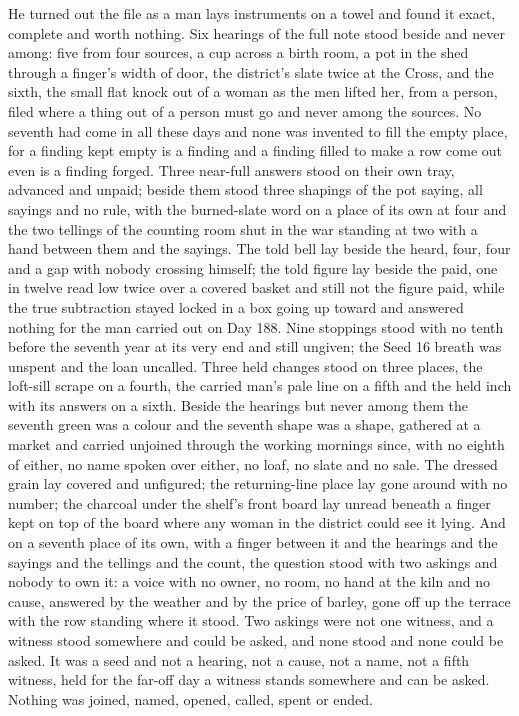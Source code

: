 He turned out the file as a man lays instruments on a towel and found it exact, complete and worth nothing. Six hearings of the full note stood beside and never among: five from four sources, a cup across a birth room, a pot in the shed through a finger's width of door, the district's slate twice at the Cross, and the sixth, the small flat knock out of a woman as the men lifted her, from a person, filed where a thing out of a person must go and never among the sources. No seventh had come in all these days and none was invented to fill the empty place, for a finding kept empty is a finding and a finding filled to make a row come out even is a finding forged. Three near-full answers stood on their own tray, advanced and unpaid; beside them stood three shapings of the pot saying, all sayings and no rule, with the burned-slate word on a place of its own at four and the two tellings of the counting room shut in the war standing at two with a hand between them and the sayings. The told bell lay beside the heard, four, four and a gap with nobody crossing himself; the told figure lay beside the paid, one in twelve read low twice over a covered basket and still not the figure paid, while the true subtraction stayed locked in a box going up toward  and answered nothing for the man carried out on Day 188. Nine stoppings stood with no tenth before the seventh year at its very end and still ungiven; the Seed 16 breath was unspent and the loan uncalled. Three held changes stood on three places, the loft-sill scrape on a fourth, the carried man's pale line on a fifth and the held inch with its answers on a sixth. Beside the hearings but never among them the seventh green was a colour and the seventh shape was a shape, gathered at a market and carried unjoined through the working mornings since, with no eighth of either, no name spoken over either, no loaf, no slate and no sale. The dressed grain lay covered and unfigured; the returning-line place lay gone around with no number; the charcoal under the shelf's front board lay unread beneath a finger kept on top of the board where any woman in the district could see it lying. And on a seventh place of its own, with a finger between it and the hearings and the sayings and the tellings and the count, the question stood with two askings and nobody to own it: a voice with no owner, no room, no hand at the kiln and no cause, answered by the weather and by the price of barley, gone off up the terrace with the row standing where it stood. Two askings were not one witness, and a witness stood somewhere and could be asked, and none stood and none could be asked. It was a seed and not a hearing, not a cause, not a name, not a fifth witness, held for the far-off day a witness stands somewhere and can be asked. Nothing was joined, named, opened, called, spent or ended.

